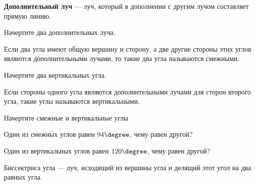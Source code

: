 \begin{class}[number=8]
	\begin{definit}
		\textbf{Дополнительный луч} --- луч, который в дополнении с другим лучом составляет прямую линию.
	\end{definit}
	\begin{listofex}[resume]
		\item Начертите два дополнительных луча.
	\end{listofex}
	\begin{definit}
		Если два угла имеют общую вершину и сторону, а две другие стороны этих углов являются дополнительными лучами, то такие два угла называются смежными.
	\end{definit}
	\begin{listofex}[resume]
		\item Начертите два вертикальных угла.
	\end{listofex}
	\begin{definit}
		Если стороны одного угла являются дополнительными лучами для сторон второго угла, такие углы называются вертикальными.
	\end{definit}
	\begin{listofex}
	 \item Начертите смежные и вертикальные углы
	 \item Один из смежных углов равен \( 94\degree \), чему равен другой?
	 \item Один из вертикальных углов равен \( 120\degree \), чему равен другой?
 	\begin{center}
 		Биссектриса угла --- луч, исходящий из вершины угла и делящий этот угол на два равных угла.

\end{center}
\end{listofex}
\end{class}
